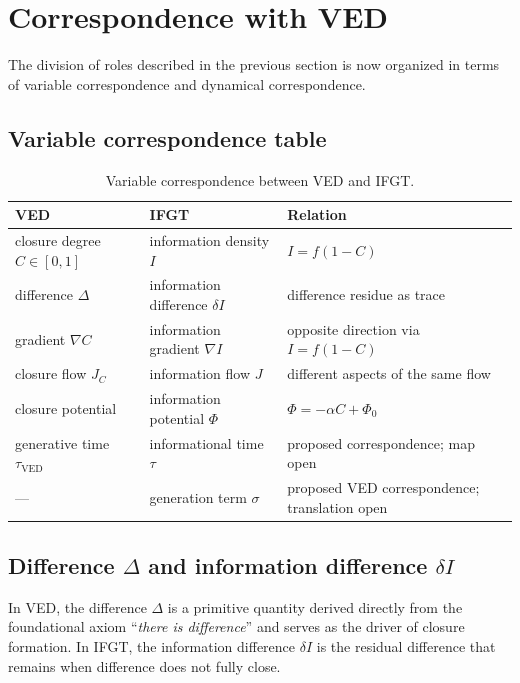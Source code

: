 \section{Correspondence with VED}
\label{sec:correspondence}

The division of roles described in the previous section is now organized in terms of variable correspondence and dynamical correspondence.

\subsection{Variable correspondence table}
\label{subsec:variable_table}

\begin{table}[h]
  \centering
  \begin{tabular}{l l l}
    \hline
    \textbf{VED} & \textbf{IFGT} & \textbf{Relation} \\
    \hline
    closure degree $C \in [0,1]$ & information density $I$ & $I = f(1 - C)$ \\
    difference $\Delta$ & information difference $\delta I$ & difference residue as trace \\
    gradient $\nabla C$ & information gradient $\nabla I$ & opposite direction via $I = f(1-C)$ \\
    closure flow $J_C$ & information flow $J$ & different aspects of the same flow \\
    closure potential & information potential $\Phi$ & $\Phi = -\alpha C + \Phi_0$ \\
    generative time $\tau_{\mathrm{VED}}$ & informational time $\tau$ & proposed correspondence; map open \\
    --- & generation term $\sigma$ & proposed VED correspondence; translation open \\
    \hline
  \end{tabular}
  \caption{Variable correspondence between VED and IFGT.}
  \label{tab:variable_correspondence}
\end{table}

\subsection{Difference \texorpdfstring{$\Delta$}{Delta} and information difference \texorpdfstring{$\delta I$}{delta I}}
\label{subsec:difference}

In VED, the difference $\Delta$ is a primitive quantity derived directly from the foundational axiom ``\emph{there is difference}'' and serves as the driver of closure formation. In IFGT, the information difference $\delta I$ is the residual difference that remains when difference does not fully close.

